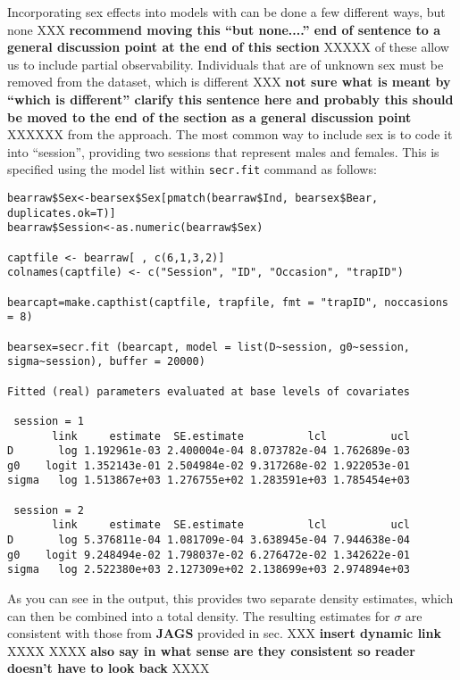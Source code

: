 Incorporating sex effects into models with \secr can be done a few
different ways, but none XXX {\bf recommend moving this ``but none....''
end of sentence to a general discussion point at the end of this
section} XXXXX
of these allow us to include partial observability.   Individuals that
are of unknown sex must be removed from the dataset, which is
different XXX {\bf not sure what is meant by ``which is different'' clarify
this sentence here and probably this should be moved to the end of the
section as a general discussion point} XXXXXX
from the \winbugs approach.  The most common way to include
sex is to code it into ``session'', providing two sessions that
represent males and females.  This is specified using the model list
within \mbox{\tt secr.fit} command as follows:
{\small 
\begin{verbatim}
bearraw$Sex<-bearsex$Sex[pmatch(bearraw$Ind, bearsex$Bear, duplicates.ok=T)]
bearraw$Session<-as.numeric(bearraw$Sex)

captfile <- bearraw[ , c(6,1,3,2)] 
colnames(captfile) <- c("Session", "ID", "Occasion", "trapID")

bearcapt=make.capthist(captfile, trapfile, fmt = "trapID", noccasions = 8)

bearsex=secr.fit (bearcapt, model = list(D~session, g0~session, sigma~session), buffer = 20000)

Fitted (real) parameters evaluated at base levels of covariates 

 session = 1 
       link     estimate  SE.estimate          lcl          ucl
D       log 1.192961e-03 2.400004e-04 8.073782e-04 1.762689e-03
g0    logit 1.352143e-01 2.504984e-02 9.317268e-02 1.922053e-01
sigma   log 1.513867e+03 1.276755e+02 1.283591e+03 1.785454e+03

 session = 2 
       link     estimate  SE.estimate          lcl          ucl
D       log 5.376811e-04 1.081709e-04 3.638945e-04 7.944638e-04
g0    logit 9.248494e-02 1.798037e-02 6.276472e-02 1.342622e-01
sigma   log 2.522380e+03 2.127309e+02 2.138699e+03 2.974894e+03
\end{verbatim}
}
As you can see in the output, this provides two separate density
estimates, which can then be combined into a total density.  The
resulting estimates for $\sigma$ are consistent with those from {\bf JAGS}
provided in sec. XXX {\bf insert dynamic link} XXXX XXXX {\bf also say in what
sense are they consistent so reader doesn't have to look back} XXXX

